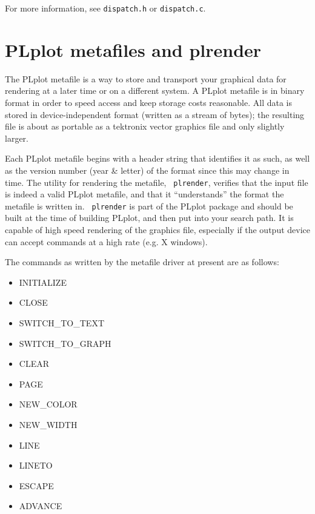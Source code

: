 For more information, see {\tt dispatch.h} or {\tt dispatch.c}.

\section{PLplot metafiles and plrender}

The PLplot metafile is a way to store and transport your graphical data for
rendering at a later time or on a different system.  A PLplot metafile is
in binary format in order to speed access and keep storage costs
reasonable.  All data is stored in device-independent format (written as a
stream of bytes); the resulting file is about as portable as a tektronix
vector graphics file and only slightly larger. 

Each PLplot metafile begins with a header string that identifies it as
such, as well as the version number (year \& letter) of the format since
this may change in time.  The utility for rendering the metafile, {\tt
plrender}, verifies that the input file is indeed a valid PLplot metafile,
and that it ``understands'' the format the metafile is written in.  {\tt
plrender} is part of the PLplot package and should be built at the time of
building PLplot, and then put into your search path.  It is capable of 
high speed rendering of the graphics file, especially if the output device
can accept commands at a high rate (e.g. X windows). 

The commands as written by the metafile driver at present are as follows:
\begin{itemize}
\item INITIALIZE 
\item CLOSE 
\item SWITCH\_TO\_TEXT 
\item SWITCH\_TO\_GRAPH 
\item CLEAR 
\item PAGE 
\item NEW\_COLOR 
\item NEW\_WIDTH 
\item LINE 
\item LINETO 
\item ESCAPE 
\item ADVANCE
\end{itemize}

